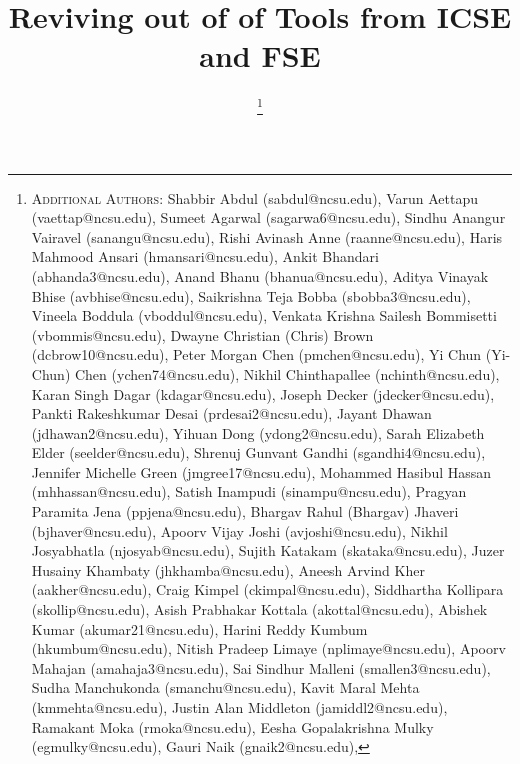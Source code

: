 \documentclass[10pt,conference]{IEEEtran}
\begin{document}
\title{Reviving \workingNum out of \totalToolsTried of Tools from ICSE and FSE}


\IEEEoverridecommandlockouts

\author{
\thanks{
\textsc{Additional Authors:}
Shabbir Abdul ({sabdul@ncsu.edu}),
Varun Aettapu ({vaettap@ncsu.edu}),
Sumeet Agarwal ({sagarwa6@ncsu.edu}),
Sindhu Anangur Vairavel ({sanangu@ncsu.edu}),
Rishi Avinash Anne ({raanne@ncsu.edu}),
Haris Mahmood Ansari ({hmansari@ncsu.edu}),
Ankit Bhandari ({abhanda3@ncsu.edu}),
Anand Bhanu ({bhanua@ncsu.edu}),
Aditya Vinayak Bhise ({avbhise@ncsu.edu}),
Saikrishna Teja Bobba ({sbobba3@ncsu.edu}),
Vineela Boddula ({vboddul@ncsu.edu}),
Venkata Krishna Sailesh Bommisetti ({vbommis@ncsu.edu}),
Dwayne Christian (Chris) Brown ({dcbrow10@ncsu.edu}),
Peter Morgan Chen ({pmchen@ncsu.edu}),
Yi Chun ({Yi-Chun}) Chen ({ychen74@ncsu.edu}),
Nikhil Chinthapallee ({nchinth@ncsu.edu}),
Karan Singh Dagar ({kdagar@ncsu.edu}),
Joseph Decker ({jdecker@ncsu.edu}),
Pankti Rakeshkumar Desai ({prdesai2@ncsu.edu}),
Jayant Dhawan ({jdhawan2@ncsu.edu}),
Yihuan Dong ({ydong2@ncsu.edu}),
Sarah Elizabeth Elder ({seelder@ncsu.edu}),
Shrenuj Gunvant Gandhi ({sgandhi4@ncsu.edu}),
Jennifer Michelle Green ({jmgree17@ncsu.edu}),
Mohammed Hasibul Hassan ({mhhassan@ncsu.edu}),
Satish Inampudi ({sinampu@ncsu.edu}),
Pragyan Paramita Jena ({ppjena@ncsu.edu}),
Bhargav Rahul ({Bhargav}) Jhaveri ({bjhaver@ncsu.edu}),
Apoorv Vijay Joshi ({avjoshi@ncsu.edu}),
Nikhil Josyabhatla ({njosyab@ncsu.edu}),
Sujith Katakam ({skataka@ncsu.edu}),
Juzer Husainy Khambaty ({jhkhamba@ncsu.edu}),
Aneesh Arvind Kher ({aakher@ncsu.edu}),
Craig Kimpel ({ckimpal@ncsu.edu}),
Siddhartha Kollipara ({skollip@ncsu.edu}),
Asish Prabhakar Kottala ({akottal@ncsu.edu}),
Abishek Kumar ({akumar21@ncsu.edu}),
Harini Reddy Kumbum ({hkumbum@ncsu.edu}),
Nitish Pradeep Limaye ({nplimaye@ncsu.edu}),
Apoorv Mahajan ({amahaja3@ncsu.edu}),
Sai Sindhur Malleni ({smallen3@ncsu.edu}),
Sudha Manchukonda ({smanchu@ncsu.edu}),
Kavit Maral Mehta ({kmmehta@ncsu.edu}),
Justin Alan Middleton ({jamiddl2@ncsu.edu}),
Ramakant Moka ({rmoka@ncsu.edu}),
Eesha Gopalakrishna Mulky ({egmulky@ncsu.edu}),
Gauri Naik ({gnaik2@ncsu.edu}),
}}
\end{document}
